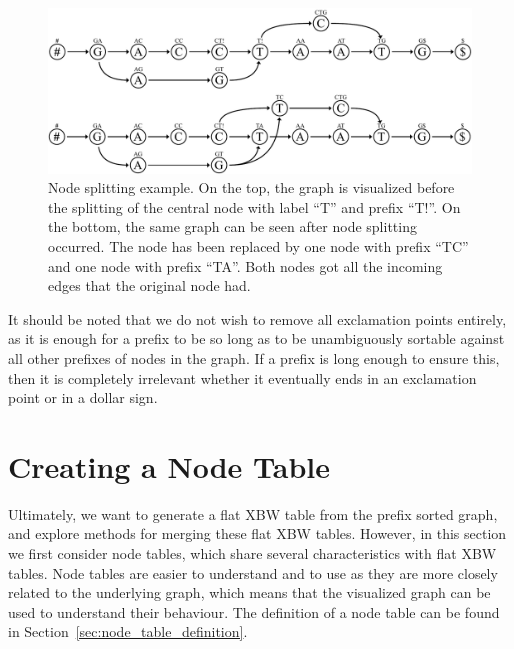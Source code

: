 \documentclass[a4paper,12pt,twoside,BCOR=10mm]{scrbook}
\begin{document}
\begin{figure}[!htb]
\centering
\includegraphics[width=\textwidth]{evo_fig_node_splitting.pdf}
\caption[Node splitting example]{Node splitting example. On the top, the graph is visualized before the splitting of the central node with label \textup{“T”} and prefix \textup{“T!”}. On the bottom, the same graph can be seen after node splitting occurred. The node has been replaced by one node with prefix \textup{“TC”} and one node with prefix \textup{“TA”}. Both nodes got all the incoming edges that the original node had.} \label{fig:evo_fig_node_splitting}
\end{figure}

It should be noted that we do not wish to remove all exclamation points entirely,
as it is enough for a prefix to be so long as to be unambiguously sortable against all
other prefixes of nodes in the graph. If a prefix is long enough to ensure this, then
it is completely irrelevant whether it eventually ends in an exclamation point or in a dollar sign.

\section{Creating a Node Table}
%

Ultimately, we want to generate a flat XBW table from the prefix sorted graph,
and explore methods for merging these flat XBW tables.
However, in this section we first consider node tables, which share several characteristics
with flat XBW tables.
Node tables are easier to understand and to use as they are more closely related to the
underlying graph, which means that the visualized graph can be used to understand their behaviour.
The definition of a node table can be found in Section~\ref{sec:node_table_definition}.
\end{document}
